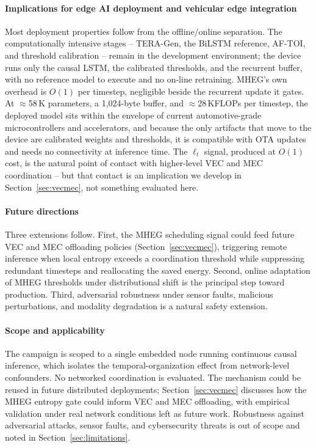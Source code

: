 \documentclass[a4paper,fleqn]{cas-dc}
\newcommand{\TERAGen}{\mbox{TERA-Gen}\xspace}
\newcommand{\AFTOI}{\mbox{AF-TOI}\xspace}
\newcommand{\MHEG}{\mbox{MHEG}\xspace}
\begin{document}
\paragraph{Implications for edge AI deployment and vehicular edge integration}
Most deployment properties follow from the offline/online separation. The computationally intensive stages -- \TERAGen, the BiLSTM reference, \AFTOI, and threshold calibration -- remain in the development environment; the device runs only the causal LSTM, the
calibrated thresholds, and the recurrent buffer, with no reference model to execute
and no on-line retraining. \MHEG's own overhead is $O(1)$ per timestep, negligible
beside the recurrent update it gates. At $\approx$58\,K parameters, a 1,024-byte
buffer, and $\approx$28\,KFLOPs per timestep, the deployed model sits within the
envelope of current automotive-grade microcontrollers and accelerators, and because
the only artifacts that move to the device are calibrated weights and thresholds, it
is compatible with OTA updates and needs no connectivity at inference time. The
$\ell_t$ signal, produced at $O(1)$ cost, is the natural point of contact with
higher-level VEC and MEC coordination -- but that contact is an implication we
develop in Section~\ref{sec:vecmec}, not something evaluated here.
\paragraph{Future directions}
Three extensions follow. First, the \MHEG scheduling signal could feed future VEC
and MEC offloading policies (Section~\ref{sec:vecmec}), triggering remote
inference when local entropy exceeds a coordination threshold while suppressing
redundant timesteps and reallocating the saved energy. Second, online adaptation
of \MHEG thresholds under distributional shift is the principal step toward
production. Third, adversarial robustness under sensor faults, malicious
perturbations, and modality degradation is a natural safety extension.
\paragraph{Scope and applicability}
\label{sec:scope}
The campaign is scoped to a single embedded node running continuous causal
inference, which isolates the temporal-organization effect from network-level
confounders. No networked coordination is evaluated. The mechanism could be
reused in future distributed deployments; Section~\ref{sec:vecmec} discusses how
the \MHEG entropy gate could inform VEC and MEC offloading, with empirical
validation under real network conditions left as future work. Robustness against
adversarial attacks, sensor faults, and cybersecurity threats is out of scope
and noted in Section~\ref{sec:limitations}.
\end{document}
